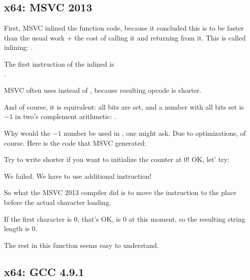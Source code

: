 ﻿\subsection{x64: \Optimizing MSVC 2013}



First, MSVC inlined the \strlen{} function code, because it concluded this 
is to be faster than the usual \strlen{} work + the cost of calling it and returning from it.
This is called inlining: .

\label{using_OR_instead_of_MOV}
The first instruction of the inlined \strlen{} is\\
. 

MSVC often uses  instead of , because resulting opcode is shorter.

And of course, it is equivalent: all bits are set, and a number with all bits set is $-1$ 
in two's complement arithmetic: .

Why would the $-1$ number be used in \strlen{}, one might ask.
Due to optimizations, of course.
Here is the code that MSVC generated:



Try to write shorter if you want to initialize the counter at 0!
OK, let' try:



We failed. We have to use additional  instruction!

So what the MSVC 2013 compiler did is to move the  instruction to the place before 
the actual character loading.

If the first character is 0, that's OK, \RAX is 0 at this moment, 
so the resulting string length is 0.

The rest in this function seems easy to understand.

\subsection{x64: \NonOptimizing GCC 4.9.1}



